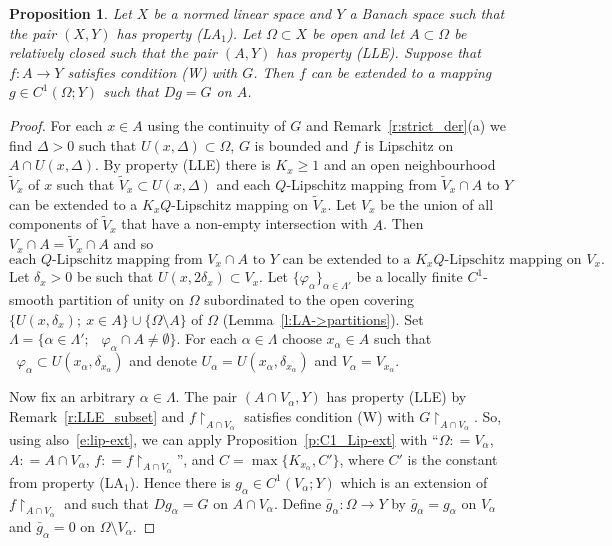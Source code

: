 \documentclass[a4paper,twoside,10pt,reqno,draft]{amsart}
\let\wtilde=\widetilde
\newtheorem{proposition}[theorem]{Proposition}
\theoremstyle{definition}
\theoremstyle{remark}
\newcommand\setsep{;\allowbreak\ } %
\newcommand\al{\alpha}
\newcommand\de{\delta}
\newcommand\vp{\varphi}
\newcommand\Om{\Omega}
\newcommand\restr[1]{\mathclose\restriction_{#1}}
\DeclareMathOperator{\suppo}{supp_o}
\newcommand\eqdef{\mathrel{\mathop:}=}
\newcommand\pLA[1]{(LA$_#1$)}
\newcommand\pLLE{(LLE)}
\newcommand\cW{(W)}
\begin{document}
\begin{proposition}\label{p:C1ext}
Let $X$ be a normed linear space and $Y$ a Banach space such that the pair $(X,Y)$ has property \pLA1.
Let $\Om\subset X$ be open and let $A\subset\Om$ be relatively closed such that the pair $(A,Y)$ has property \pLLE.
Suppose that $f\colon A\to Y$ satisfies condition {\cW} with $G$.
Then $f$ can be extended to a mapping $g\in C^1(\Om;Y)$ such that $Dg=G$ on $A$.
\end{proposition}
\begin{proof}
For each $x\in A$ using the continuity of $G$ and Remark~\ref{r:strict_der}(a) we find $\Delta>0$ such that $U(x,\Delta)\subset\Om$, $G$ is bounded and $f$ is Lipschitz on $A\cap U(x,\Delta)$.
By property {\pLLE} there is $K_x\ge1$ and an open neighbourhood $\wtilde V_x$ of $x$ such that $\wtilde V_x\subset U(x,\Delta)$ and
each $Q$-Lipschitz mapping from $\wtilde V_x\cap A$ to $Y$ can be extended to a $K_xQ$-Lipschitz mapping on $\wtilde V_x$.
Let $V_x$ be the union of all components of $\wtilde V_x$ that have a non-empty intersection with $A$.
Then $V_x\cap A=\wtilde V_x\cap A$ and so
\begin{equation}\label{e:lip-ext}
\text{each $Q$-Lipschitz mapping from $V_x\cap A$ to $Y$ can be extended to a $K_xQ$-Lipschitz mapping on $V_x$.}
\end{equation}
Let $\de_x>0$ be such that $U(x,2\de_x)\subset V_x$.
Let $\{\vp_\al\}_{\al\in\Lambda'}$ be a locally finite $C^1$-smooth partition of unity on $\Om$ subordinated to the open covering $\{U(x,\de_x)\setsep x\in A\}\cup\{\Om\setminus A\}$ of $\Om$ (Lemma~\ref{l:LA->partitions}).
Set $\Lambda=\{\al\in\Lambda'\setsep\suppo\vp_\al\cap A\neq\emptyset\}$.
For each $\al\in\Lambda$ choose $x_\al\in A$ such that $\suppo\vp_\al\subset U(x_\al,\de_{x_\al})$ and denote $U_\al=U(x_\al,\de_{x_\al})$ and $V_\al=V_{x_\al}$.

Now fix an arbitrary $\al\in\Lambda$.
The pair $(A\cap V_\al,Y)$ has property {\pLLE} by Remark~\ref{r:LLE_subset} and $f\restr{A\cap V_\al}$ satisfies condition {\cW} with $G\restr{A\cap V_\al}$.
So, using also~\eqref{e:lip-ext}, we can apply Proposition~\ref{p:C1_Lip-ext} with ``$\Om\eqdef V_\al$, $A\eqdef A\cap V_\al$, $f\eqdef f\restr{A\cap V_\al}$'', and $C=\max\{K_{x_\al},C'\}$, where $C'$ is the constant from property \pLA1.
Hence there is $g_\al\in C^1(V_\al;Y)$ which is an extension of $f\restr{A\cap V_\al}$ and such that $Dg_\al=G$ on $A\cap V_\al$.
Define $\bar g_\al\colon\Om\to Y$ by $\bar g_\al=g_\al$ on $V_\al$ and $\bar g_\al=0$ on $\Om\setminus V_\al$.


\end{proof}
\end{document}
